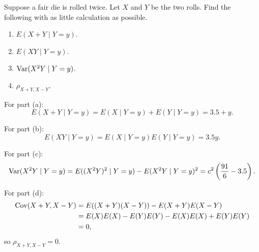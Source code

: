 \begin{problem}[Handout 15, \# 15]
  Suppose a fair die is rolled twice. Let \(X\) and \(Y\) be the two
  rolls. Find the following with as little calculation as possible.
  \begin{enumerate}[label=(\alph*),noitemsep]
  \item \(E(X+Y\mid Y=y)\).
  \item \(E(XY\mid Y=y)\).
  \item \(\operatorname{Var}(X^2Y\mid Y=y)\).
  \item \(\rho_{X+Y,X-Y}\).
  \end{enumerate}
\end{problem}
\begin{solution}
  For part (a):
  \[E(X+Y\mid Y=y) = E(X\mid Y=y) + E(Y\mid Y=y) = 3.5+y.\]

  For part (b):
  \[E(XY\mid Y=y) = E(X\mid Y=y)E(Y\mid Y=y) = 3.5y.\]

  For part (c):
  \[
    \operatorname{Var}(X^2Y\mid Y=y)=E((X^2Y)^2\mid Y=y)-E(X^2Y\mid Y=y)^2
    =c^2\left(\frac{91}{6}-3.5\right).
  \]

  For part (d):
  \begin{align*}
    \operatorname{Cov}(X+Y,X-Y)
    &=E((X+Y)(X-Y))-E(X+Y)E(X-Y)\\
    &=E(X)E(X)-E(Y)E(Y)-E(X)E(X)+E(Y)E(Y)\\
    &=0,
  \end{align*}
  so $\rho_{X+Y,X-Y} = 0$.
\end{solution}

